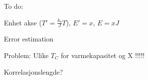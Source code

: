 To do:

Enhet akse ($ T' = \frac{k_b}{J} T $), $ E'  = x$, $ E = xJ $

Error estimation

Problem: 
	Ulike $T_C$ for varmekapasitet og X !!!!!
	
Korrelasjonslengde?
